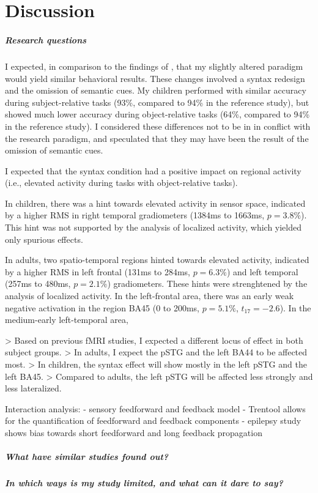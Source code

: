 \chapter{Discussion}

\paragraph{Research questions}

I expected, in comparison to the findings of \cite{2.1}, that my slightly altered paradigm would yield similar behavioral results.
These changes involved a syntax redesign and the omission of semantic cues.
My children performed with similar accuracy during subject-relative tasks (93\%, compared to 94\% in the reference study), but showed much lower accuracy during object-relative tasks (64\%, compared to 94\% in the reference study).
I considered these differences not to be in in conflict with the research paradigm, and speculated that they may have been the result of the omission of semantic cues.


I expected that the syntax condition had a positive impact on regional activity (i.e., elevated activity during tasks with object-relative tasks).

In children, there was a hint towards elevated activity in sensor space, indicated by a higher RMS in right temporal gradiometers (1384ms to 1663ms, $p = 3.8\%$).
This hint was not supported by the analysis of localized activity, which yielded only spurious effects.

In adults, two spatio-temporal regions hinted towards elevated activity, indicated by a higher RMS in left frontal (131ms to 284ms, $p = 6.3\%$) and left temporal (257ms to 480ms, $p = 2.1\%$) gradiometers. 
These hints were strenghtened by the analysis of localized activity.
In the left-frontal area, there was an early weak negative activation in the region BA45 (0 to 200ms, $p = 5.1\%$, $t_{17} = -2.6$).
In the medium-early left-temporal area, 

> Based on previous fMRI studies, I expected a different locus of effect in both subject groups.
> In adults, I expect the pSTG and the left BA44 to be affected most.
> In children, the syntax effect will show mostly in the left pSTG and the left BA45.
> Compared to adults, the left pSTG will be affected less strongly and less lateralized.


Interaction analysis:
- sensory feedforward and feedback model
- Trentool allows for the quantification of feedforward and feedback components
- epilepsy study shows bias towards short feedforward and long feedback propagation

\paragraph{What have similar studies found out?}

\paragraph{In which ways is my study limited, and what can it dare to say?}